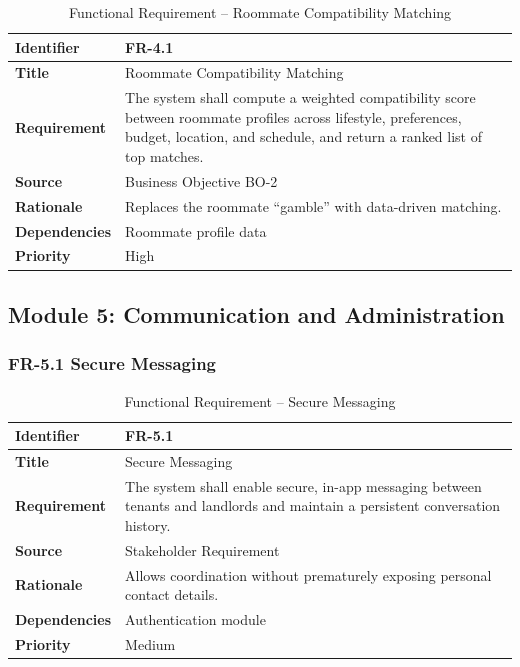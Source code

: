 \begin{table}[h]
\centering
\caption{Functional Requirement -- Roommate Compatibility Matching}

\begin{tabularx}{\textwidth}{|>{\raggedright\arraybackslash}p{3cm}|X|}
\hline
\textbf{Identifier} & FR-4.1 \\
\hline
\textbf{Title} & Roommate Compatibility Matching \\
\hline
\textbf{Requirement} & The system shall compute a weighted compatibility score between roommate profiles across lifestyle, preferences, budget, location, and schedule, and return a ranked list of top matches. \\
\hline
\textbf{Source} & Business Objective BO-2 \\
\hline
\textbf{Rationale} & Replaces the roommate ``gamble'' with data-driven matching. \\
\hline
\textbf{Dependencies} & Roommate profile data \\
\hline
\textbf{Priority} & High \\
\hline
\end{tabularx}

\end{table}

\subsection{Module 5: Communication and Administration}

\subsubsection{FR-5.1 Secure Messaging}

\begin{table}[h]
\centering
\caption{Functional Requirement -- Secure Messaging}

\begin{tabularx}{\textwidth}{|>{\raggedright\arraybackslash}p{3cm}|X|}
\hline
\textbf{Identifier} & FR-5.1 \\
\hline
\textbf{Title} & Secure Messaging \\
\hline
\textbf{Requirement} & The system shall enable secure, in-app messaging between tenants and landlords and maintain a persistent conversation history. \\
\hline
\textbf{Source} & Stakeholder Requirement \\
\hline
\textbf{Rationale} & Allows coordination without prematurely exposing personal contact details. \\
\hline
\textbf{Dependencies} & Authentication module \\
\hline
\textbf{Priority} & Medium \\
\hline
\end{tabularx}

\end{table}

